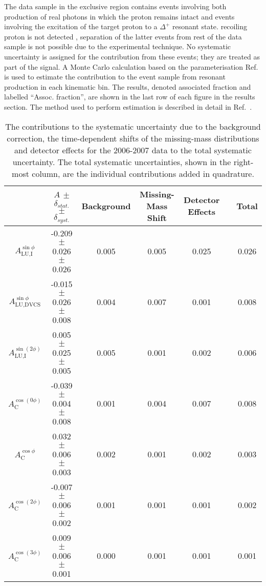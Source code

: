The data sample in the exclusive region contains events involving both production of real photons in which the proton remains intact and events involving the excitation of the target proton to a $\Delta^+$ resonant state.  recoiling proton is not detected , separation of the latter events from rest of the data sample is not possible due to the experimental technique.
No systematic uncertainty is assigned for the contribution from these events; they are treated as part of the signal. A Monte Carlo calculation based on the parameterisation  Ref.~\cite{Bra76} is used to estimate the contribution to the event sample from resonant production in each kinematic bin. The results, denoted associated fraction and labelled ``Assoc. fraction'', are shown in the last row of each figure in the results section. The method used to perform  estimation is described in detail in
Ref.~\cite{Air08}.

\begin{table}[H]
 \begin{center}
\resizebox{16cm}{!} {
 \begin{tabular}{|c|c|c|c|c|c|c|}
  \hline
 & $A$ $\pm$ $\delta_{stat.}$ $\pm$ $\delta_{syst.}$ & Background & Missing-Mass Shift & Detector Effects & & Total \\
  \hline
  \hline
  $A_{\textrm{LU,I}}^{\sin\phi}$ & -0.209  $\pm$  0.026  $\pm$   0.026 & 0.005 & 0.005 & 0.025 & & 0.026 \\
  \hline
  $A_{\textrm{LU,DVCS}}^{\sin\phi}$ & -0.015  $\pm$  0.026  $\pm$  0.008 & 0.004 & 0.007 & 0.001 & & 0.008 \\
  \hline
  $A_{\textrm{LU,I}}^{\sin(2\phi)}$ & 0.005  $\pm$  0.025  $\pm$   0.005 & 0.005 & 0.001 & 0.002 & & 0.006 \\
  \hline
  \hline
  $A_{\textrm{C}}^{\cos(0\phi)}$ & -0.039 $\pm$  0.004 $\pm$  0.008 & 0.001 & 0.004 & 0.007 & & 0.008 \\
  \hline
  $A_{\textrm{C}}^{\cos\phi}$ & 0.032  $\pm$  0.006 $\pm$   0.003 & 0.002 & 0.001 & 0.002 & & 0.003 \\
  \hline
  $A_{\textrm{C}}^{\cos(2\phi)}$ & -0.007  $\pm$  0.006  $\pm$   0.002 & 0.001 & 0.001 & 0.001 & & 0.002 \\
  \hline
  $A_{\textrm{C}}^{\cos(3\phi)}$ & 0.009  $\pm$   0.006   $\pm$   0.001 & 0.000 & 0.001 & 0.001 & & 0.001 \\
  \hline
 \end{tabular}
}
  \caption{The contributions to the systematic uncertainty due to the
background correction, the time-dependent shifts of the missing-mass
distributions and detector effects for the 2006-2007 data to the total
systematic uncertainty. The total systematic uncertainties, shown in the
right-most column, are the individual contributions added in quadrature.}
  \label{table_systematic_contributions_0607}
\end{center}
\end{table}

